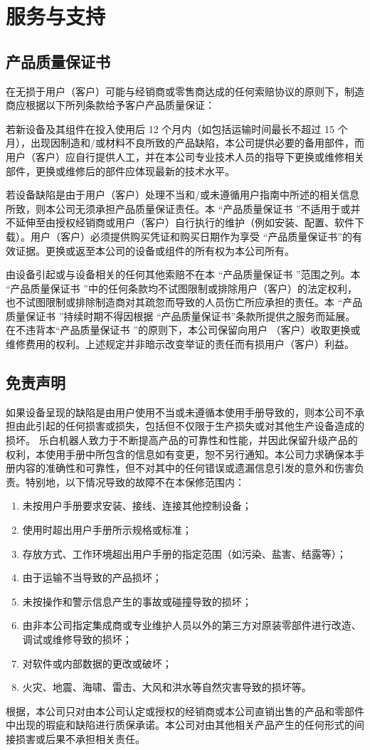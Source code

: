 \chapter{服务与支持}

\section{产品质量保证书}
\label{sec:产品质量保证书}
在无损于用户（客户）可能与经销商或零售商达成的任何索赔协议的原则下，制造商应根据以下所列条款给予客户产品质量保证：

若新设备及其组件在投入使用后 12 个月内（如包括运输时间最长不超过 15 个月），出现因制造和/或材料不良所致的产品缺陷，本公司提供必要的备用部件，而用户（客户）应自行提供人工，并在本公司专业技术人员的指导下更换或维修相关部件，更换或维修后的部件应体现最新的技术水平。

若设备缺陷是由于用户（客户）处理不当和/或未遵循用户指南中所述的相关信息所致，则本公司无须承担产品质量保证责任。本 “产品质量保证书 ”不适用于或并不延伸至由授权经销商或用户（客户）自行执行的维护（例如安装、配置、软件下载）。用户（客户）必须提供购买凭证和购买日期作为享受 “产品质量保证书”的有效证据。更换或返至本公司的设备或组件的所有权为本公司所有。

由设备引起或与设备相关的任何其他索赔不在本 “产品质量保证书 ”范围之列。本 “产品质量保证书 ”中的任何条款均不试图限制或排除用户（客户）的法定权利，也不试图限制或排除制造商对其疏忽而导致的人员伤亡所应承担的责任。本 “产品质量保证书 ”持续时期不得因根据 “产品质量保证书”条款所提供之服务而延展。在不违背本“产品质量保证书 ”的原则下，本公司保留向用户 （客户）收取更换或维修费用的权利。上述规定并非暗示改变举证的责任而有损用户（客户）利益。

\section{免责声明}
如果设备呈现的缺陷是由用户使用不当或未遵循本使用手册导致的，则本公司不承担由此引起的任何损害或损失，包括但不仅限于生产损失或对其他生产设备造成的损坏。
乐白机器人致力于不断提高产品的可靠性和性能，并因此保留升级产品的权利，本使用手册中所包含的信息如有变更，恕不另行通知。本公司力求确保本手册内容的准确性和可靠性，但不对其中的任何错误或遗漏信息引发的意外和伤害负责。特别地，以下情况导致的故障不在本保修范围内：
\begin{enumerate}
\item 未按用户手册要求安装、接线、连接其他控制设备；
\item 使用时超出用户手册所示规格或标准；
\item 存放方式、工作环境超出用户手册的指定范围（如污染、盐害、结露等）；
\item 由于运输不当导致的产品损坏；
\item 未按操作和警示信息产生的事故或碰撞导致的损坏；
\item 由非本公司指定集成商或专业维护人员以外的第三方对原装零部件进行改造、调试或维修导致的损坏；
\item 对软件或内部数据的更改或破坏；
\item 火灾、地震、海啸、雷击、大风和洪水等自然灾害导致的损坏等。
\end{enumerate}

根据，本公司只对由本公司认定或授权的经销商或本公司直销出售的产品和零部件中出现的瑕疵和缺陷进行质保承诺。本公司对由其他相关产品产生的任何形式的间接损害或后果不承担相关责任。
